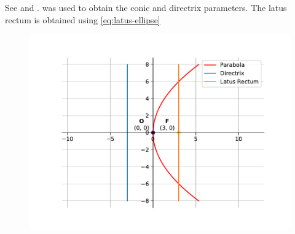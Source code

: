 See 
and 
.
	 was used to obtain the conic and directrix parameters.
			The latus rectum is obtained using \eqref{eq:latus-ellipse}
			
\begin{figure}[H]
		\begin{center}
	\includegraphics[width=0.75\columnwidth]{chapters/11/11/2/1/figs/fig.pdf}
	\end{center}
\caption{}
\label{fig:11/11/2/1Fig1}
\end{figure}
